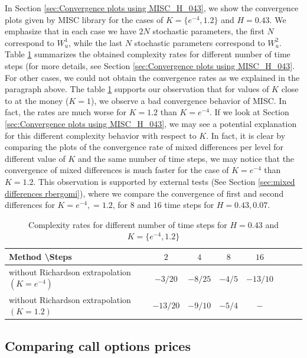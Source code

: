 \documentclass[11pt]{article}
\begin{document}
In Section \ref{sec:Convergence plots using MISC_H_043}, we show the convergence plots given by MISC library for the cases of $K=\{e^{-4},1.2\}$ and $H=0.43$. We emphasize that in each case we have $2N$ stochastic parameters, the first $N$ correspond to $W_u^1$, while the last $N$ stochastic parameters correspond to $W_u^2$. Table \ref{table: Complexity rates for different number of time steps_rbergomi} summarizes the obtained complexity rates for different number of time steps (for more details, see Section \ref{sec:Convergence plots using MISC_H_043}. For other cases, we could not obtain the convergence rates as we explained in the paragraph above. The table \ref{table: Complexity rates for different number of time steps_rbergomi} supports our observation that for values of $K$ close to at the money ($K=1$), we observe a bad convergence behavior of MISC. In fact, the rates are much worse for $K=1.2$ than $K=e^{-4}$. If we look at Section \ref{sec:Convergence plots using MISC_H_043}, we may see a potential explanation for this different complexity behavior with respect to $K$. In fact, it is clear by comparing the plots of  the convergence rate of mixed differences per level for different value of $K$ and  the same number of time steps, we may notice that the convergence of mixed differences is much faster for the case of $K=e^{-4}$ than $K=1.2$. This observation is supported by external tests (See Section \ref{sec:mixed differences rbergomi}), where we compare the convergence of first and second differences for $K=e^{-4},=1.2$, for $8$ and $16$ time steps for $H=0.43,0.07$. 

\begin{table}[h!]
	\centering
	\begin{tabular}{l*{6}{c}r}
		Method \textbackslash  Steps             & $2$ & $4$ & $8$  & $16$   \\
		\hline
		without Richardson  extrapolation $(K=e^{-4})$ & $-3/20$ & $-8/25$ & $-4/5$ & $- 13/10$  \\
		without Richardson  extrapolation $(K=1.2)$ & $-13/20$ & $-9/10$ & $-5/4$ & $-$  \\
		\hline
	\end{tabular}
	\caption{Complexity rates for different number of time steps for $H=0.43$ and $K=\{e^{-4},1.2\}$}
	\label{table: Complexity rates for different number of time steps_rbergomi}
\end{table}


\subsection{Comparing call options prices }\label{sec:Comparing call options prices rbergomi}
\end{document}
